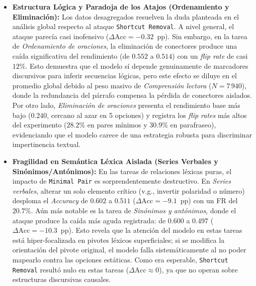 \documentclass[11pt]{article}
\begin{document}
\begin{itemize}
    \item \textbf{Estructura Lógica y Paradoja de los Atajos (Ordenamiento y Eliminación):}
    Los datos desagregados resuelven la duda planteada en el análisis global
    respecto al ataque \texttt{Shortcut Removal}. A nivel general, el ataque
    parecía casi inofensivo ($\Delta\text{Acc} = -0.32$~pp). Sin embargo, en la
    tarea de \textit{Ordenamiento de oraciones}, la eliminación de conectores
    produce una caída significativa del rendimiento (de $0.552$ a $0.514$) con un
    \textit{flip rate} de casi $12\%$. Esto demuestra que el modelo sí depende
    genuinamente de marcadores discursivos para inferir secuencias lógicas, pero
    este efecto se diluye en el promedio global debido al peso masivo de
    \textit{Comprensión lectora} ($N=7\,940$), donde la redundancia del párrafo
    compensa la pérdida de conectores aislados. Por otro lado, \textit{Eliminación de oraciones}
    presenta el rendimiento base más bajo ($0.240$, cercano al azar en 5 opciones)
    y registra los \textit{flip rates} más altos del experimento ($28.2\%$ en
    pares mínimos y $30.9\%$ en parafraseo), evidenciando que el modelo carece de
    una estrategia robusta para discriminar impertinencia textual.

    \item \textbf{Fragilidad en Semántica Léxica Aislada (Series Verbales y Sinónimos/Antónimos):}
    En las tareas de relaciones léxicas puras, el impacto de \texttt{Minimal Pair}
    es sorprendentemente destructivo. En \textit{Series verbales}, alterar un solo
    elemento crítico (v.g., invertir polaridad o número) desploma el \textit{Accuracy}
    de $0.602$ a $0.511$ ($\Delta\text{Acc} = -9.1$~pp) con un FR del $20.7\%$.
    Aún más notable es la tarea de \textit{Sinónimos y antónimos}, donde el ataque
    produce la caída más aguda registrada: de $0.600$ a $0.497$ ($\Delta\text{Acc} = -10.3$~pp).
    Esto revela que la atención del modelo en estas tareas está hiper-focalizada
    en pivotes léxicos superficiales; si se modifica la orientación del pivote
    original, el modelo falla sistemáticamente al no poder mapearlo contra las
    opciones estáticas. Como era esperable, \texttt{Shortcut Removal} resultó nulo
    en estas tareas ($\Delta\text{Acc} \approx 0$), ya que no operan sobre
    estructuras discursivas causales.


\end{itemize}
\end{document}
